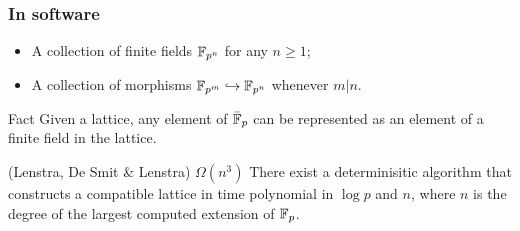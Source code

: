 \documentclass[12pt]{beamer}
\begin{document}

\begin{frame}
  \frametitle{In software}

  \begin{definition}
    \begin{itemize}
    \item A collection of finite fields $\mathbb{F}_{p^n}$ for any $n\ge 1$;
    \item A collection of morphisms $\mathbb{F}_{p^m} \hookrightarrow \mathbb{F}_{p^n}$ whenever $m|n$.
    \end{itemize}
  \end{definition}

  \begin{block}{Fact}
    Given a lattice, any element of $\bar{\mathbb{F}}_p$ can be represented as
    an element of a finite field in the lattice.
  \end{block}

  \begin{block}{(Lenstra, De Smit \& Lenstra) \hfill\alert{$\Omega(n^3)$}}
    There exist a determinisitic algorithm that constructs a
    compatible lattice in time polynomial in $\log p$ and $n$, where
    $n$ is the degree of the largest computed extension of $\mathbb{F}_p$.
  \end{block}
\end{frame}

\end{document}
